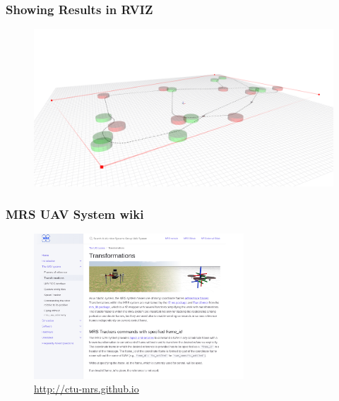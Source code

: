\documentclass[aspectratio=1610]{beamer}
\begin{document}


  \begin{frame}
    \frametitle{Showing Results in RVIZ}

    \begin{figure}
      \includegraphics[width=1.0\textwidth]{fig/rviz_2.png}
    \end{figure}

  \end{frame}




  \begin{frame}
    \frametitle{MRS UAV System wiki}
    \begin{figure}
      \vspace{-1em}
      \caption*{\url{http://ctu-mrs.github.io}}
      \includegraphics[width=0.7\textwidth]{fig/wiki.png}
    \end{figure}

  \end{frame}
\end{document}
